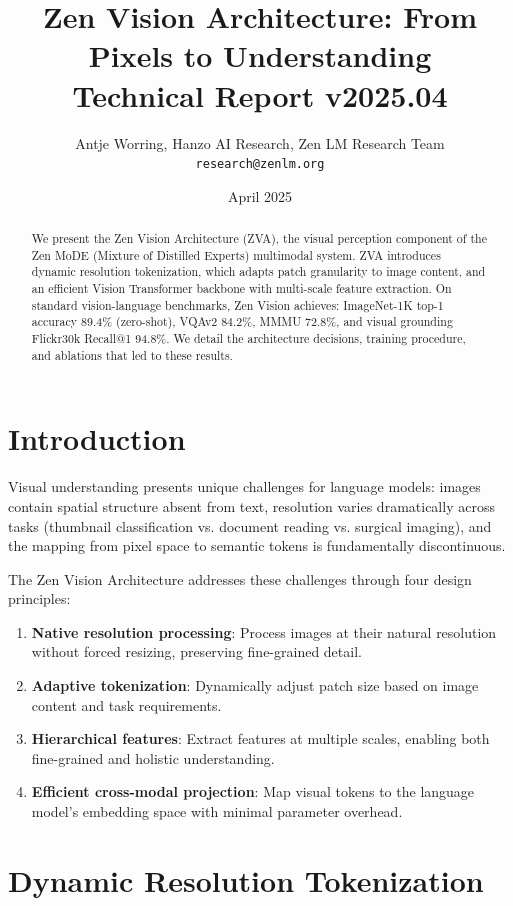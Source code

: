 \documentclass[11pt,a4paper]{article}
\title{\textbf{Zen Vision Architecture: From Pixels to Understanding}\\
\large Technical Report v2025.04}
\author{Antje Worring, Hanzo AI Research, Zen LM Research Team\\
\texttt{research@zenlm.org}}
\date{April 2025}
\begin{document}
\maketitle

\begin{abstract}
We present the Zen Vision Architecture (ZVA), the visual perception component of the Zen MoDE (Mixture of Distilled Experts) multimodal system. ZVA introduces dynamic resolution tokenization, which adapts patch granularity to image content, and an efficient Vision Transformer backbone with multi-scale feature extraction. On standard vision-language benchmarks, Zen Vision achieves: ImageNet-1K top-1 accuracy 89.4\% (zero-shot), VQAv2 84.2\%, MMMU 72.8\%, and visual grounding Flickr30k Recall@1 94.8\%. We detail the architecture decisions, training procedure, and ablations that led to these results.
\end{abstract}

\section{Introduction}

Visual understanding presents unique challenges for language models: images contain spatial structure absent from text, resolution varies dramatically across tasks (thumbnail classification vs. document reading vs. surgical imaging), and the mapping from pixel space to semantic tokens is fundamentally discontinuous.

The Zen Vision Architecture addresses these challenges through four design principles:

\begin{enumerate}
  \item \textbf{Native resolution processing}: Process images at their natural resolution without forced resizing, preserving fine-grained detail.
  \item \textbf{Adaptive tokenization}: Dynamically adjust patch size based on image content and task requirements.
  \item \textbf{Hierarchical features}: Extract features at multiple scales, enabling both fine-grained and holistic understanding.
  \item \textbf{Efficient cross-modal projection}: Map visual tokens to the language model's embedding space with minimal parameter overhead.
\end{enumerate}

\section{Dynamic Resolution Tokenization}
\end{document}
